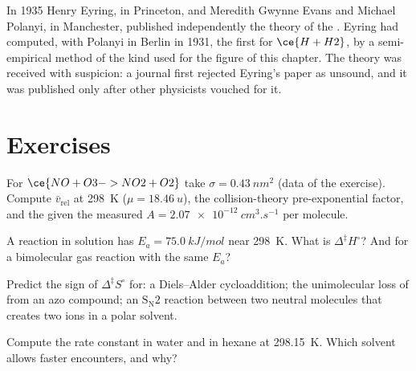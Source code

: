 \begin{history}
In 1935 Henry Eyring, in Princeton, and Meredith Gwynne Evans and Michael
Polanyi, in Manchester, published independently the theory of the . Eyring had computed, with Polanyi in Berlin in 1931, the first
 for $\ce{H + H2}$, by a semi-empirical method of the kind used
for the figure of this chapter. The theory was received with suspicion: a
journal first rejected Eyring's paper as unsound, and it was published only
after other physicists vouched for it.
\end{history}

\section{Exercises}

\begin{exercise}[$\star$]\label{exo:b3:rate-theories:1}
For $\ce{NO + O3 -> NO2 + O2}$ take $\sigma = \qty{0.43}{nm^2}$ (data of the exercise). Compute $\bar v_{\mathrm{rel}}$
at \qty{298}{K} ($\mu = \qty{18.46}{u}$), the collision-theory pre-exponential factor, and the
 given the measured $A = \qty{2.07e-12}{cm^3.s^{-1}}$ per molecule.
\end{exercise}

\begin{exercise}[$\star$]\label{exo:b3:rate-theories:2}
A reaction in solution has $E_a = \qty{75.0}{kJ/mol}$ near \qty{298}{K}. What is $\Delta^{\ddagger}H^\circ$? And
for a bimolecular gas reaction with the same $E_a$?
\end{exercise}

\begin{exercise}[$\star$]\label{exo:b3:rate-theories:3}
Predict the sign of $\Delta^{\ddagger}S^\circ$ for: a Diels--Alder cycloaddition; the
unimolecular loss of  from an azo compound; an $\mathrm{S_N2}$ reaction between two
neutral molecules that creates two ions in a polar solvent.
\end{exercise}

\begin{exercise}[$\star$]\label{exo:b3:rate-theories:4}
Compute the  rate constant in water and in hexane at
\qty{298.15}{K}. Which solvent allows faster encounters, and why?
\end{exercise}

